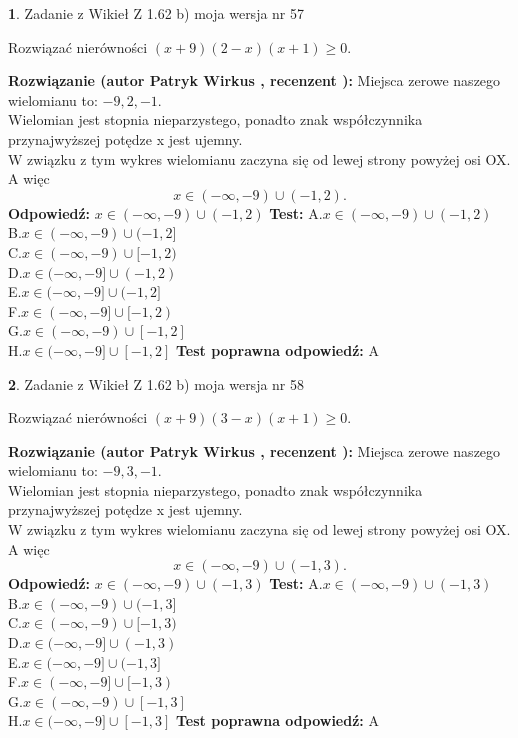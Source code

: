 \documentclass[12pt, a4paper]{article}
\theoremstyle{definition} %
\newtheorem{zad}{}
\newcommand{\zadStart}[1]{\begin{zad}#1\newline}
\newcommand{\zadStop}{\end{zad}}
\newcommand{\rozwStart}[2]{\noindent \textbf{Rozwiązanie (autor #1 , recenzent #2): }\newline}
\newcommand{\rozwStop}{\newline}
\newcommand{\odpStart}{\noindent \textbf{Odpowiedź:}\newline}
\newcommand{\odpStop}{\newline}
\newcommand{\testStart}{\noindent \textbf{Test:}\newline}
\newcommand{\testStop}{\newline}
\newcommand{\kluczStart}{\noindent \textbf{Test poprawna odpowiedź:}\newline}
\newcommand{\kluczStop}{\newline}
\begin{document}
\zadStart{Zadanie z Wikieł Z 1.62 b) moja wersja nr 57}

Rozwiązać nierówności $(x+9)(2-x)(x+1)\ge0$.
\zadStop
\rozwStart{Patryk Wirkus}{}
Miejsca zerowe naszego wielomianu to: $-9, 2, -1$.\\
Wielomian jest stopnia nieparzystego, ponadto znak współczynnika przy\linebreak najwyższej potędze x jest ujemny.\\ W związku z tym wykres wielomianu zaczyna się od lewej strony powyżej osi OX. A więc $$x \in (-\infty,-9) \cup (-1,2).$$
\rozwStop
\odpStart
$x \in (-\infty,-9) \cup (-1,2)$
\odpStop
\testStart
A.$x \in (-\infty,-9) \cup (-1,2)$\\
B.$x \in (-\infty,-9) \cup (-1,2]$\\
C.$x \in (-\infty,-9) \cup [-1,2)$\\
D.$x \in (-\infty,-9] \cup (-1,2)$\\
E.$x \in (-\infty,-9] \cup (-1,2]$\\
F.$x \in (-\infty,-9] \cup [-1,2)$\\
G.$x \in (-\infty,-9) \cup [-1,2]$\\
H.$x \in (-\infty,-9] \cup [-1,2]$
\testStop
\kluczStart
A
\kluczStop



\zadStart{Zadanie z Wikieł Z 1.62 b) moja wersja nr 58}

Rozwiązać nierówności $(x+9)(3-x)(x+1)\ge0$.
\zadStop
\rozwStart{Patryk Wirkus}{}
Miejsca zerowe naszego wielomianu to: $-9, 3, -1$.\\
Wielomian jest stopnia nieparzystego, ponadto znak współczynnika przy\linebreak najwyższej potędze x jest ujemny.\\ W związku z tym wykres wielomianu zaczyna się od lewej strony powyżej osi OX. A więc $$x \in (-\infty,-9) \cup (-1,3).$$
\rozwStop
\odpStart
$x \in (-\infty,-9) \cup (-1,3)$
\odpStop
\testStart
A.$x \in (-\infty,-9) \cup (-1,3)$\\
B.$x \in (-\infty,-9) \cup (-1,3]$\\
C.$x \in (-\infty,-9) \cup [-1,3)$\\
D.$x \in (-\infty,-9] \cup (-1,3)$\\
E.$x \in (-\infty,-9] \cup (-1,3]$\\
F.$x \in (-\infty,-9] \cup [-1,3)$\\
G.$x \in (-\infty,-9) \cup [-1,3]$\\
H.$x \in (-\infty,-9] \cup [-1,3]$
\testStop
\kluczStart
A
\kluczStop
\end{document}
